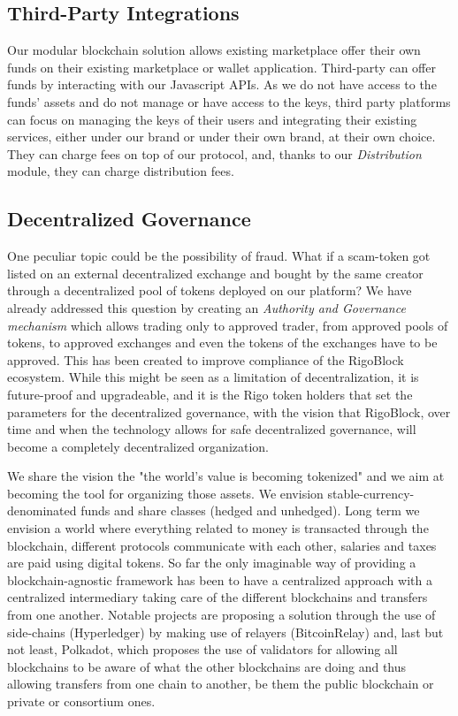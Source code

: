 \documentclass[9pt,oneside]{amsart}
\begin{document}
\begin{multicols}{2}
\subsection{Third-Party Integrations}
Our modular blockchain solution allows existing marketplace offer their own funds on their existing marketplace or wallet application. Third-party can offer funds by interacting with our Javascript APIs. As we do not have access to the funds' assets and do not manage or have access to the keys, third party platforms can focus on managing the keys of their users and integrating their existing services, either under our brand or under their own brand, at their own choice. They can charge fees on top of our protocol, and, thanks to our \textit{Distribution} module, they can charge distribution fees. 

\subsection{Decentralized Governance}
One peculiar topic could be the possibility of fraud. What if a scam-token got listed on an external decentralized exchange and bought by the same creator through a decentralized pool of tokens deployed on our platform? We have already addressed this question by creating an \textit{Authority and Governance mechanism} which allows trading only to approved trader, from approved pools of tokens, to approved exchanges and even the tokens of the exchanges have to be approved. This has been created to improve compliance of the RigoBlock ecosystem. While this might be seen as a limitation of decentralization, it is future-proof and upgradeable, and it is the Rigo token holders that set the parameters for the decentralized governance, with the vision that RigoBlock, over time and when the technology allows for safe decentralized governance, will become a completely decentralized organization.

We share the vision the "the world's value is becoming tokenized" and we aim at becoming the tool for organizing those assets. We envision stable-currency-denominated funds and share classes (hedged and unhedged). Long term we envision a world where everything related to money is transacted through the blockchain, different protocols communicate with each other, salaries and taxes are paid using digital tokens. So far the only imaginable way of providing a blockchain-agnostic framework has been to have a centralized approach with a centralized intermediary taking care of the different blockchains and transfers from one another. Notable projects are proposing a solution through the use of side-chains (Hyperledger) by making use of relayers (BitcoinRelay) and, last but not least, Polkadot, which proposes the use of validators for allowing all blockchains to be aware of what the other blockchains are doing and thus allowing transfers from one chain to another, be them the public blockchain or private or consortium ones.


\end{multicols}
\end{document}
